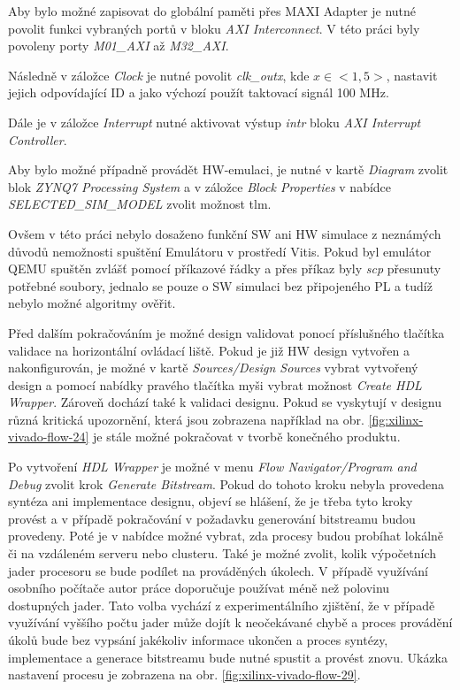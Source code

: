 \documentclass[a4paper, twoside, 11pt]{article}
\begin{document}
		Aby bylo možné zapisovat do globální paměti přes MAXI Adapter je nutné povolit funkci vybraných portů v bloku \textit{AXI Interconnect}. V této práci byly povoleny porty \textit{M01\_AXI} až \textit{M32\_AXI}.\par
		Následně v záložce \textit{Clock} je nutné povolit \textit{clk\_outx}, kde $x \in <1,5>$, nastavit jejich odpovídající ID a jako výchozí použít taktovací signál 100 MHz.\par
		Dále je v záložce \textit{Interrupt} nutné aktivovat výstup \textit{intr} bloku \textit{AXI Interrupt Controller}.\par
		Aby bylo možné případně provádět HW-emulaci, je nutné v kartě \textit{Diagram} zvolit blok \textit{ZYNQ7 Processing System} a v záložce \textit{Block Properties} v nabídce \textit{SELECTED\_SIM\_MODEL} zvolit možnost tlm. \cite{hackster-vitis-2021-1-embedded-platform-for-zybo-z7-20}\par
		Ovšem v této práci nebylo dosaženo funkční SW ani HW simulace z neznámých důvodů nemožnosti spuštění Emulátoru v prostředí Vitis. Pokud byl emulátor QEMU spuštěn zvlášť pomocí příkazové řádky a přes příkaz byly \textit{scp} přesunuty potřebné soubory, jednalo se pouze o SW simulaci bez připojeného PL a tudíž nebylo možné algoritmy ověřit.\par
		Před dalším pokračováním je možné design validovat ponocí příslušného tlačítka validace na horizontální ovládací liště. Pokud je již HW design vytvořen a nakonfigurován, je možné v kartě \textit{Sources/Design Sources} vybrat vytvořený design a pomocí nabídky pravého tlačítka myši vybrat možnost \textit{Create HDL Wrapper}. Zároveň dochází také k validaci designu. Pokud se vyskytují v designu různá kritická upozornění, která jsou zobrazena například na obr. \ref{fig:xilinx-vivado-flow-24} je stále možné pokračovat v tvorbě konečného produktu.\par
		Po vytvoření \textit{HDL Wrapper} je možné v menu \textit{Flow Navigator/Program and Debug} zvolit krok \textit{Generate Bitstream}. Pokud do tohoto kroku nebyla provedena syntéza ani implementace designu, objeví se hlášení, že je třeba tyto kroky provést a v případě pokračování v požadavku generování bitstreamu budou provedeny. Poté je v nabídce možné vybrat, zda procesy budou probíhat lokálně či na vzdáleném serveru nebo clusteru. Také je možné zvolit, kolik výpočetních jader procesoru se bude podílet na prováděných úkolech. V případě využívání osobního počítače autor práce doporučuje používat méně než polovinu dostupných jader. Tato volba vychází z experimentálního zjištění, že v případě využívání vyššího počtu jader může dojít k neočekávané chybě a proces provádění úkolů bude bez vypsání jakékoliv informace ukončen a proces syntézy, implementace a generace bitstreamu bude nutné spustit a provést znovu. Ukázka nastavení procesu je zobrazena na obr. \ref{fig:xilinx-vivado-flow-29}.\par
\end{document}
